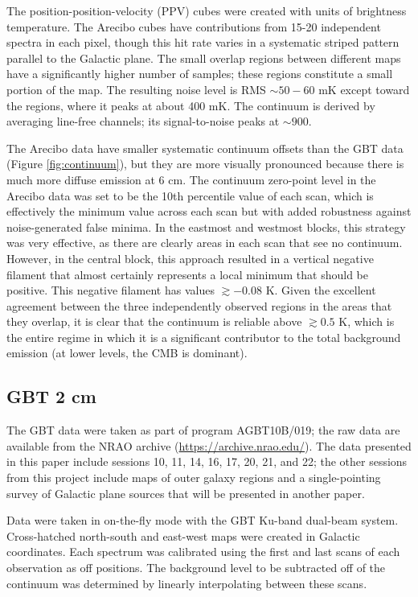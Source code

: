 The position-position-velocity (PPV) cubes were created with units of
brightness temperature.  The Arecibo cubes have contributions from 15-20
independent spectra in each pixel, though
this hit rate varies in a systematic striped pattern parallel to the Galactic
plane.  The small overlap regions between different maps have a significantly
higher number of samples; these regions constitute a small portion of the map.
The resulting noise level is RMS $\sim 50-60$ mK except toward the \hii
regions, where it peaks at about 400 mK.  The continuum is derived by averaging
line-free channels; its signal-to-noise peaks at $\sim900$.

The Arecibo data have smaller systematic continuum offsets than the GBT data
(Figure \ref{fig:continuum}), but they are more visually pronounced because
there is much more diffuse emission at 6 cm.  The continuum zero-point level in
the Arecibo data was set to be the 10th percentile value of each scan, which is
effectively the minimum value across each scan but with added robustness
against noise-generated false minima.  In the eastmost and westmost blocks,
this strategy was very effective, as there are clearly areas in each scan that
see no continuum.  However, in the central block, this approach resulted in a
vertical negative filament that almost certainly represents a local minimum
that should be positive.  This negative filament has values $\gtrsim-0.08$ K.
Given the excellent agreement between the three independently observed regions
in the areas that they overlap, it is clear that the continuum is reliable
above $\gtrsim0.5$ K, which is the entire regime in which it is a significant
contributor to the total background emission (at lower levels, the CMB is
dominant).

\subsection{GBT 2 cm}
The GBT data were
taken as part of program AGBT10B/019; the raw data are available from the NRAO
archive (\url{https://archive.nrao.edu/}).  The data presented in this paper
include sessions 10, 11, 14, 16, 17, 20, 21, and 22; the other sessions from
this project include maps of outer galaxy regions and a single-pointing survey
of Galactic plane sources that will be presented in another paper. 

Data were taken in on-the-fly mode with the GBT Ku-band dual-beam system.
Cross-hatched north-south and east-west maps were created in Galactic
coordinates. 
Each spectrum was calibrated using the first and last scans of each observation
as off positions.  The background level to be subtracted off of the
continuum was determined by linearly interpolating between these scans.

